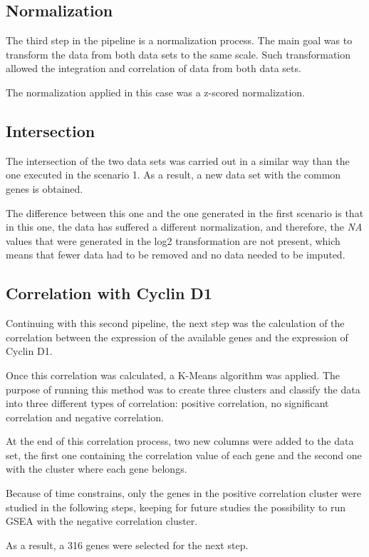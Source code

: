 \subsection{Normalization}
The third step in the pipeline is a normalization process. The main goal was to transform the data from both data sets to the same scale.
Such transformation allowed the integration and correlation of data from both data sets.

The normalization applied in this case was a z-scored normalization.

\subsection{Intersection}
The intersection of the two data sets was carried out in a similar way than the one executed in the scenario 1.
As a result, a new data set with the common genes is obtained.

The difference between this one and the one generated in the first scenario is that in this one, the data has suffered a different normalization, and therefore, the \textit{NA} values that were generated in the log2 transformation are not present, which means that fewer data had to be removed and no data needed to be imputed.

\subsection{Correlation with Cyclin D1}
Continuing with this second pipeline, the next step was the calculation of the correlation between the expression of the available genes and the expression of Cyclin D1.

Once this correlation was calculated, a K-Means algorithm was applied.
The purpose of running this method was to create three clusters and classify the data into three different types of correlation: positive correlation, no significant correlation and negative correlation.

At the end of this correlation process, two new columns were added to the data set, the first one containing the correlation value of each gene and the second one with the cluster where each gene belongs.

Because of time constrains, only the genes in the positive correlation cluster were studied in the following steps, keeping for future studies the possibility to run GSEA with the negative correlation cluster.

As a result, a 316 genes were selected for the next step.

